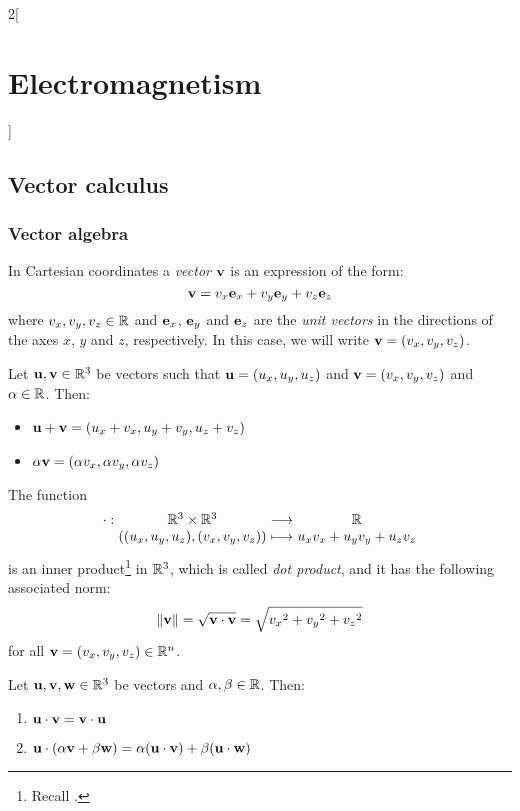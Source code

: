 \documentclass[../../../main_physics.tex]{subfiles}
\begin{document}
\renewcommand{\col}{\phy}
\begin{multicols}{2}[\section{Electromagnetism}]
  \subsection{Vector calculus}
  \subsubsection{Vector algebra}
  \begin{definition}
    In Cartesian coordinates a \emph{vector} $\boldsymbol{\mathrm{v}}$ is an expression of the form: $$\boldsymbol{\mathrm{v}}=v_x\boldsymbol{\mathrm{e}}_x+v_y\boldsymbol{\mathrm{e}}_y+v_z\boldsymbol{\mathrm{e}}_z$$
    where $v_x,v_y,v_z\in\mathbb{R}$ and $\boldsymbol{\mathrm{e}}_x$, $\boldsymbol{\mathrm{e}}_y$ and $\boldsymbol{\mathrm{e}}_z$ are the \emph{unit vectors} in the directions of the axes $x$, $y$ and $z$, respectively. In this case, we will write $\boldsymbol{\mathrm{v}}=(v_x,v_y,v_z)$.
  \end{definition}
  \begin{proposition}
    Let $\boldsymbol{\mathrm{u}},\boldsymbol{\mathrm{v}}\in\mathbb{R}^3$ be vectors such that $\boldsymbol{\mathrm{u}}=(u_x,u_y,u_z)$ and $\boldsymbol{\mathrm{v}}=(v_x,v_y,v_z)$ and $\alpha\in\mathbb{R}$. Then:
    \begin{itemize}
      \item $\boldsymbol{\mathrm{u}}+\boldsymbol{\mathrm{v}}=(u_x+v_x,u_y+v_y,u_z+v_z)$
      \item $\alpha\boldsymbol{\mathrm{v}}=(\alpha v_x,\alpha v_y,\alpha v_z)$
    \end{itemize}
  \end{proposition}
  \begin{proposition}
    The function $$\function{\cdot}{\RR^3\times\RR^3}{\RR}{((u_x,u_y,u_z),(v_x,v_y,v_z))}{u_xv_x+u_yv_y+u_zv_z}$$ is an inner product\footnote{Recall .} in $\mathbb{R}^3$, which is called \emph{dot product}, and it has the following associated norm: $$\|\boldsymbol{\mathrm{v}}\|=\sqrt{\boldsymbol{\mathrm{v}}\cdot\boldsymbol{\mathrm{v}}}=\sqrt{{v_x}^2+{v_y}^2+{v_z}^2}$$ for all $\boldsymbol{\mathrm{v}}=(v_x,v_y,v_z)\in\mathbb{R}^n$.
  \end{proposition}
  \begin{proposition}
    Let $\boldsymbol{\mathrm{u}},\boldsymbol{\mathrm{v}},\boldsymbol{\mathrm{w}}\in\mathbb{R}^3$ be vectors and $\alpha,\beta \in\mathbb{R}$. Then:
    \begin{enumerate}
      \item $\boldsymbol{\mathrm{u}}\cdot\boldsymbol{\mathrm{v}}=\boldsymbol{\mathrm{v}}\cdot\boldsymbol{\mathrm{u}}$
      \item $\boldsymbol{\mathrm{u}}\cdot(\alpha\boldsymbol{\mathrm{v}}+\beta\boldsymbol{\mathrm{w}})=\alpha(\boldsymbol{\mathrm{u}}\cdot\boldsymbol{\mathrm{v}})+\beta(\boldsymbol{\mathrm{u}}\cdot\boldsymbol{\mathrm{w}})$

\end{enumerate}
\end{proposition}
\end{multicols}
\end{document}
